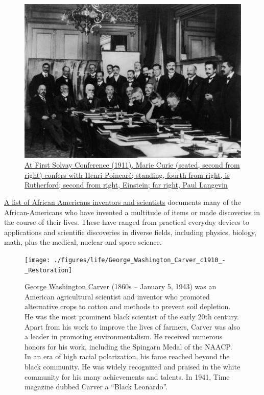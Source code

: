 \begin{figure}

{\centering \includegraphics[width=0.7\linewidth]{./figures/life/1911_Solvay_conference} 

}

\caption{\href{https://commons.wikimedia.org/wiki/File:1911_Solvay_conference.jpg}{At First Solvay Conference (1911), Marie Curie (seated, second from right) confers with Henri Poincaré; standing, fourth from right, is Rutherford; second from right, Einstein; far right, Paul Langevin}}\label{fig:mariecuriesolvay}
\end{figure}

\href{https://en.wikipedia.org/wiki/List_of_African-American_inventors_and_scientists}{A list of African Americans inventors and scientists} documents many of the African-Americans who have invented a multitude of items or made discoveries in the course of their lives. These have ranged from practical everyday devices to applications and scientific discoveries in diverse fields, including physics, biology, math, plus the medical, nuclear and space science.



\begin{figure}

{\centering \texttt{[image: ./figures/life/George\_Washington\_Carver\_c1910\_-\_Restoration]} 

}

\caption{\href{https://en.wikipedia.org/wiki/George_Washington_Carver}{George Washington Carver} (1860s -- January 5, 1943) was an American agricultural scientist and inventor who promoted alternative crops to cotton and methods to prevent soil depletion. He was the most prominent black scientist of the early 20th century. Apart from his work to improve the lives of farmers, Carver was also a leader in promoting environmentalism. He received numerous honors for his work, including the Spingarn Medal of the NAACP. In an era of high racial polarization, his fame reached beyond the black community. He was widely recognized and praised in the white community for his many achievements and talents. In 1941, Time magazine dubbed Carver a ``Black Leonardo''.}\label{fig:gwcarter}
\end{figure}

